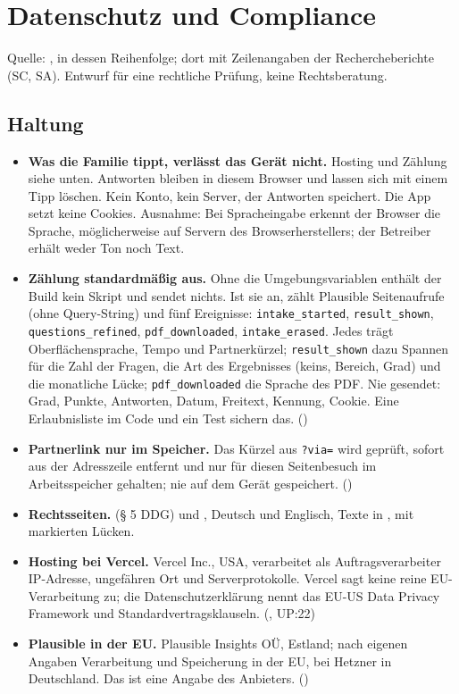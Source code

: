 \documentclass[10pt,parskip=half-]{scrartcl}
\begin{document}
\section{Datenschutz und Compliance}

Quelle: , in dessen Reihenfolge; dort mit Zeilenangaben der
Rechercheberichte (SC, SA). Entwurf für eine rechtliche Prüfung, keine Rechtsberatung.

\subsection{Haltung}
\begin{itemize}
  \item \textbf{Was die Familie tippt, verlässt das Gerät nicht.} Hosting und Zählung siehe
    unten. Antworten bleiben in diesem Browser und lassen sich
    mit einem Tipp löschen. Kein Konto, kein Server, der Antworten speichert. Die App setzt
    keine Cookies. Ausnahme: Bei Spracheingabe erkennt der Browser die Sprache, möglicherweise
    auf Servern des Browserherstellers; der Betreiber erhält weder Ton noch Text.
  \item \textbf{Zählung standardmäßig aus.} Ohne die Umgebungsvariablen enthält der Build kein
    Skript und sendet nichts. Ist sie an, zählt Plausible Seitenaufrufe (ohne Query-String) und
    fünf Ereignisse: \texttt{intake\_started}, \texttt{result\_shown},
    \texttt{questions\_refined}, \texttt{pdf\_downloaded}, \texttt{intake\_erased}. Jedes trägt
    Oberflächensprache, Tempo und Partnerkürzel; \texttt{result\_shown} dazu Spannen für die
    Zahl der Fragen, die Art des Ergebnisses (keins, Bereich, Grad) und die monatliche Lücke;
    \texttt{pdf\_downloaded} die Sprache des PDF. Nie gesendet: Grad, Punkte, Antworten, Datum,
    Freitext, Kennung, Cookie. Eine Erlaubnisliste im Code und ein Test sichern das.
    ()
  \item \textbf{Partnerlink nur im Speicher.} Das Kürzel aus \texttt{?via=} wird geprüft, sofort
    aus der Adresszeile entfernt und nur für diesen Seitenbesuch im Arbeitsspeicher gehalten;
    nie auf dem Gerät gespeichert. ()
  \item \textbf{Rechtsseiten.}  (§ 5 DDG) und , Deutsch
    und Englisch, Texte in , mit markierten Lücken.
  \item \textbf{Hosting bei Vercel.} Vercel Inc., USA, verarbeitet als Auftragsverarbeiter
    IP-Adresse, ungefähren Ort und Serverprotokolle. Vercel sagt keine reine EU-Verarbeitung
    zu; die Datenschutzerklärung nennt das EU-US Data Privacy Framework und
    Standardvertragsklauseln. (, UP:22)
  \item \textbf{Plausible in der EU.} Plausible Insights OÜ, Estland; nach eigenen Angaben
    Verarbeitung und Speicherung in der EU, bei Hetzner in Deutschland. Das ist eine Angabe des
    Anbieters. ()
\end{itemize}
\end{document}
